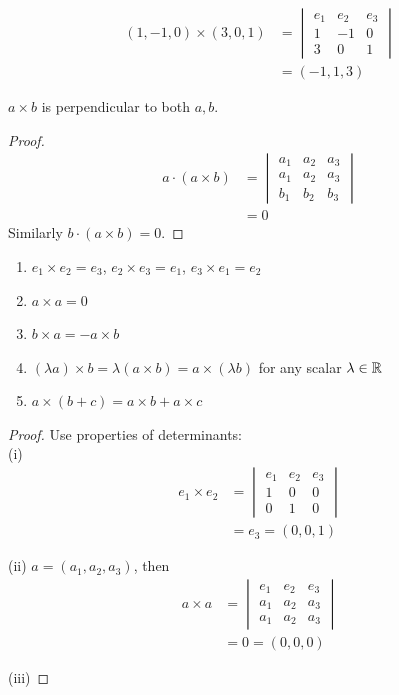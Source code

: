 \documentclass[10pt]{scrartcl}
\begin{document}
\begin{example}
\begin{align*}
  (1,-1,0) \times (3,0,1)
  &= \begin{vmatrix}
 e_1 & e_2 & e_3\\
 1 & -1 & 0\\
 3 & 0 & 1	
 \end{vmatrix}\\
 &= (-1,1,3)
\end{align*}
\end{example}\vsp

\begin{proposition}
$a\times b$ is perpendicular to both $a,b$. 	
\end{proposition}
\begin{proof}
	\begin{align*}
  a \cdot (a \times b) &= \begin{vmatrix}
 a_1& a_2 & a_3\\
 a_1 & a_2 & a_3\\
 b_1 & b_2 & b_3	
 \end{vmatrix}\\
 &= 0
\end{align*}
Similarly $b \cdot (a \times b) = 0$.
\end{proof}


\begin{proposition}
\begin{enumerate}
\item $e_1 \times e_2 = e_3$, $e_2 \times e_3 = e_1$, $e_3 \times e_1 = e_2$
\item $a \times a = 0$
\item $b \times a = -a \times b$
\item $(\lambda a) \times b= \lambda(a \times b) = a \times (\lambda b)$ for any scalar $\lambda \in\mathbb{R}$
\item $a \times (b + c) = a \times b + a \times c$	
\end{enumerate}
\end{proposition}
\begin{proof} Use properties of determinants:\\
(i) \begin{align*}
  e_1 \times e_2 &= \begin{vmatrix}
 e_1 & e_2 & e_3\\
 1 & 0 & 0\\
 0 & 1 & 0	
 \end{vmatrix}\\
 &= e_3 = (0,0,1)
\end{align*}

(ii) $a = (a_1,a_2,a_3)$, then 
\begin{align*}
  a \times a &= \begin{vmatrix}
 e_1 & e_2 & e_3\\
 a_1 & a_2 & a_3\\
 a_1 & a_2 & a_3	
 \end{vmatrix}\\
 &= 0 = (0,0,0)
\end{align*}

(iii) 

	
\end{proof}
\end{document}
